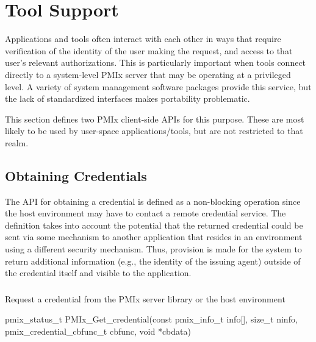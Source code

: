 \chapter{Tool Support}
\label{chap:tool_support}

Applications and tools often interact with each other in ways that require verification of the identity of the user making the request, and access to that user's relevant authorizations. This is particularly important when tools connect directly to a system-level \ac{PMIx} server that may be operating at a privileged level. A variety of system management software packages provide this service, but the lack of standardized interfaces makes portability problematic.

This section defines two \ac{PMIx} client-side \acp{API} for this purpose. These are most likely to be used by user-space applications/tools, but are not restricted to that realm.


\section{Obtaining Credentials}
\label{chap:api_security:obtain}

The \ac{API} for obtaining a credential is defined as a non-blocking operation since the host environment may have to contact a remote credential service. The definition takes into account the potential that the returned credential could be sent via some mechanism to another application that resides in an environment using a different security mechanism. Thus, provision is made for the system to return additional information (e.g., the identity of the issuing agent) outside of the credential itself and visible to the application.

\subsection{}

\summary

Request a credential from the \ac{PMIx} server library or the host environment

\format

\cspecificstart
\begin{codepar}
pmix_status_t PMIx_Get_credential(const pmix_info_t info[], size_t ninfo,
                             pmix_credential_cbfunc_t cbfunc, void *cbdata)
\end{codepar}
\cspecificend

